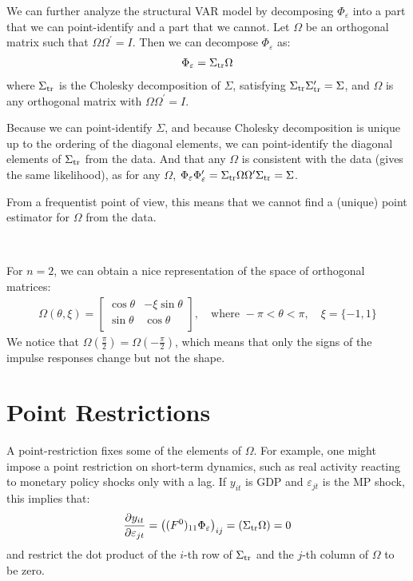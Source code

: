 We can further analyze the structural VAR model by decomposing $\Phi_{\varepsilon}$ into a part that we can point-identify and a part that we cannot.
Let $\Omega $ be an orthogonal matrix such that $\Omega \Omega^{\prime} = I$.
Then we can decompose $\Phi_{\varepsilon}$ as:
\begin{gather*}
    \Phi_{\varepsilon} = \Sigma_{\operatorname{tr}} \Omega
\end{gather*}
where $\Sigma_{\operatorname{tr}}$ is the Cholesky decomposition of $\Sigma$, satisfying $\Sigma_{\operatorname{tr}} \Sigma_{\operatorname{tr}}^{\prime} = \Sigma$,
and $\Omega$ is any orthogonal matrix with $\Omega \Omega^{\prime} = I.$

Because we can point-identify $\Sigma$, and because Cholesky decomposition is unique up to the ordering of the diagonal elements,
we can point-identify the diagonal elements of $\Sigma_{\operatorname{tr}}$ from the data.
And that any $\Omega$ is consistent with the data (gives the same likelihood), as for any $\Omega$,
$\Phi_{\varepsilon} \Phi_{\varepsilon}^{\prime} = \Sigma_{\operatorname{tr}} \Omega \Omega^{\prime} \Sigma_{\operatorname{tr}} = \Sigma$.

From a frequentist point of view, this means that we cannot find a
(unique) point estimator for $\Omega$ from the data.

\begin{eg}
    \

    For $n=2$, we can obtain a  nice representation of the space of orthogonal matrices:
    \begin{gather*}
        \Omega(\theta, \xi) = \begin{bmatrix}
            \cos \theta & -\xi \sin \theta \\
            \sin \theta & \cos \theta \\
        \end{bmatrix}, \quad
        \text{where } -\pi < \theta < \pi, \quad \xi = \{-1,1\}
    \end{gather*}
    We notice that $\Omega(\frac{\pi}{2}) = \Omega(-\frac{\pi}{2})$,
    which means that only the signs of the impulse responses change but not the shape.
\end{eg}

\section{Point Restrictions}
\label{sec:point-restrictions}

A point-restriction fixes some of the elements of $\Omega $.
For example, one might impose a point restriction on short-term dynamics,
such as real activity reacting to monetary policy shocks only with a lag.
If $y_{it}$ is GDP and $\varepsilon_{jt}$ is the MP shock, this implies that:
\begin{gather*}
    \frac{\partial y_{it}}{\partial \varepsilon_{jt}} = \left( (F^0)_{11} \Phi_{\varepsilon} \right)_{ij} = \left(\Sigma_{\operatorname{tr}} \Omega \right) = 0
\end{gather*}
and restrict the dot product of the $i$-th row of $\Sigma_{\operatorname{tr}}$ and the $j$-th column of $\Omega$ to be zero.

